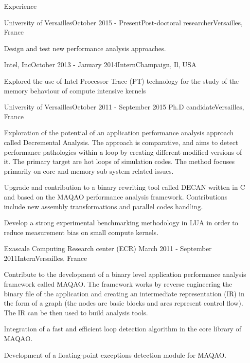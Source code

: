 \documentclass{resume} %
\begin{document}

\begin{rSection}{Experience}

\begin{rSubsection}{University of Versailles}{October 2015 - Present}{Post-doctoral researcher}{Versailles, France}
\item Design and test new performance analysis approaches.  
\end{rSubsection}


\begin{rSubsection}{Intel, Inc}{October 2013 - January 2014}{Intern}{Champaign, Il, USA}
\item Explored the use of Intel Processor Trace (PT) technology for the 
      study of the memory behaviour of compute intensive kernels
\end{rSubsection}


\begin{rSubsection}{University of Versailles}{October 2011 - September 2015}
                   {Ph.D candidate}{Versailles, France}
\item Exploration of the potential of an application performance analysis approach
      called Decremental Analysis. The approach is comparative, and aims to detect
      performance pathologies within a loop by creating different modified versions
      of it. The primary target are hot loops of simulation codes. The method focuses 
      primarily on core and memory sub-system related issues.
\item Upgrade and contribution to a binary rewriting tool called DECAN written in C
      and based on the MAQAO performance analysis framework. Contributions include
      new assembly transformations and parallel codes handling.   
\item Develop a strong experimental benchmarking methodology in LUA in order to 
      reduce measurement bias on small compute kernels. 
\end{rSubsection}


\begin{rSubsection}{Exascale Computing Research center (ECR)}
                   {March 2011 - September 2011}{Intern}{Versailles, France}
\item Contribute to the development of a binary level application performance 
      analysis framework called MAQAO. The framework works by reverse engineering 
      the binary file of the application and creating an intermediate representation 
      (IR) in the form of a graph (the nodes are basic blocks and arcs represent 
      control flow). The IR can be then used to build analysis tools.  
\item Integration of a fast and efficient loop detection algorithm in the core 
      library of MAQAO.  
\item Development of a floating-point exceptions detection module for MAQAO.
\end{rSubsection}



\end{rSection}
\end{document}
